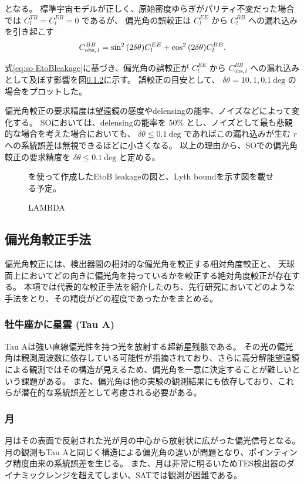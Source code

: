\documentclass[../../main.tex]{subfiles}
\begin{document}
となる。
標準宇宙モデルが正しく、原始密度ゆらぎがパリティ不変だった場合では $C_{l}^{TB}=C_{l}^{EB}=0$ であるが、
偏光角の誤較正は $C_{l}^{EE}$ から $C_{l}^{BB}$ への漏れ込みを引き起こす
\begin{equation}
    \label{eq:so-EtoBleakage}
    C_{\mathrm{obs},\,l}^{BB} = \sin^2\qty(2\delta\theta)C_{l}^{EE} + \cos^2\qty(2\delta\theta)C_{l}^{BB} .
\end{equation}

式\eqref{eq:so-EtoBleakage}に基づき、偏光角の誤較正が $C_{l}^{EE}$ から $C_{\mathrm{obs}, l}^{BB}$ への漏れ込みとして及ぼす影響を図\ref{}に示す。
誤較正の目安として、 $\delta\theta = 10, 1, 0.1\ \mathrm{deg}$ の場合をプロットした。

偏光角較正の要求精度は望遠鏡の感度やdelensingの能率、ノイズなどによって変化する。
SOにおいては、delensingの能率を 50\% とし、ノイズとして最も悲観的な場合を考えた場合においても、
$\delta\theta \leq 0.1\ \mathrm{deg}$ であればこの漏れ込みが生む $r$ への系統誤差は無視できるほどに小さくなる。\cite{so:Bryan_2018}
以上の理由から、SOでの偏光角較正の要求精度を $\delta\theta \leq 0.1\ \mathrm{deg}$ と定める。

\begin{figure}[H]
    \centering
    \caption{LAMBDA}を使って作成したEtoB leakageの図と、Lyth boundを示す図を載せる予定。
\end{figure}

\subsection{偏光角較正手法}
偏光角較正には、検出器間の相対的な偏光角を較正する相対角度較正と、
天球面上においてどの向きに偏光角を持っているかを較正する絶対角度較正が存在する。
本項では代表的な較正手法を紹介したのち、先行研究においてどのような手法をとり、その精度がどの程度であったかをまとめる。
\subsubsection{牡牛座かに星雲 (Tau A)}
Tau Aは強い直線偏光性を持つ光を放射する超新星残骸である。
その光の偏光角は観測周波数に依存している可能性が指摘されており、さらに高分解能望遠鏡による観測ではその構造が見えるため、偏光角を一意に決定することが難しいという課題がある。
また、偏光角は他の実験の観測結果にも依存しており、これらが潜在的な系統誤差として考慮される必要がある。
\subsubsection{月}
月はその表面で反射された光が月の中心から放射状に広がった偏光信号となる。
月の観測もTau Aと同じく構造による偏光角の違いが問題となり、ポインティング精度由来の系統誤差を生じる。
また、月は非常に明るいためTES検出器のダイナミックレンジを超えてしまい、SATでは観測が困難である。
\end{document}
